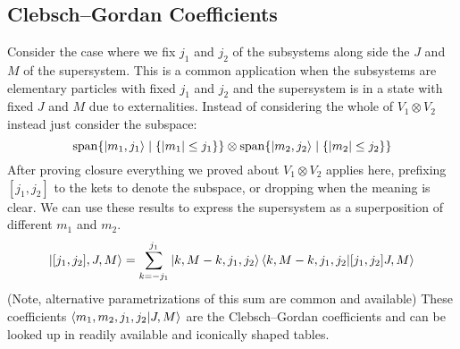 \subsection{Clebsch–Gordan Coefficients}
Consider the case where we fix $j_1$ and $j_2$ of the subsystems along side the $J$ and $M$ of the supersystem.
This is a common application when the subsystems are elementary particles with fixed $j_1$ and $j_2$ and the supersystem is in a state with fixed $J$ and $M$ due to externalities. 
Instead of considering the whole of $V_1\otimes V_2$ instead just consider the subspace:
\[\operatorname{span}\{\left|m_1,j_1\right\rangle\mid\{|m_1|\leq j_1\}\}\otimes\operatorname{span}\{\left|m_2,j_2\right\rangle\mid\{|m_2|\leq j_2\}\}\]
After proving closure everything we proved about $V_1\otimes V_2$ applies here,
prefixing $[j_1,j_2]$ to the kets to denote the subspace,
or dropping when the meaning is clear.
We can use these results to express the supersystem as a superposition of different $m_1$ and $m_2$.
\[\left|[j_1,j_2],J,M\right\rangle = \sum_{k=-j_1}^{j_1}\left|k,M-k,j_1,j_2\right\rangle\left\langle k,M-k,j_1,j_2\middle|[j_1,j_2]J,M\right\rangle\]
(Note, alternative parametrizations of this sum are common and available)
These coefficients $\left\langle m_1,m_2,j_1,j_2\middle|J,M\right\rangle$ are the Clebsch–Gordan coefficients and can be looked up in readily available and iconically shaped tables.

